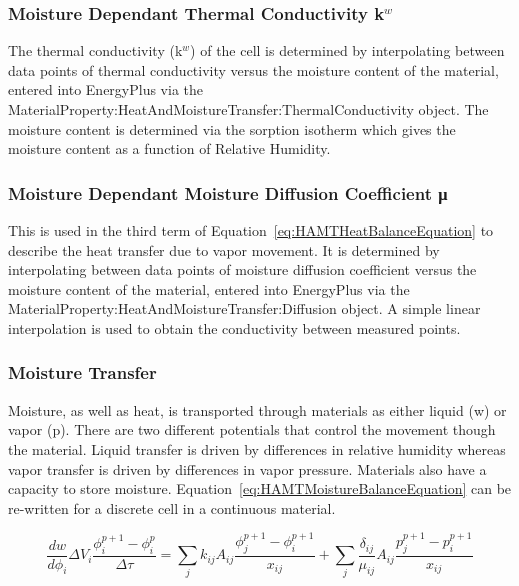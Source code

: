\subsubsection{Moisture Dependant Thermal Conductivity k\(^{w}\)}\label{moisture-dependant-thermal-conductivity-kw}

The thermal conductivity (k\(^{w}\)) of the cell is determined by interpolating between data points of thermal conductivity versus the moisture content of the material, entered into EnergyPlus via the MaterialProperty:HeatAndMoistureTransfer:ThermalConductivity object. The moisture content is determined via the sorption isotherm which gives the moisture content as a function of Relative Humidity.

\subsubsection{Moisture Dependant Moisture Diffusion Coefficient μ}\label{moisture-dependant-moisture-diffusion-coefficient-ux3bc}

This is used in the third term of Equation~\ref{eq:HAMTHeatBalanceEquation} to describe the heat transfer due to vapor movement. It is determined by interpolating between data points of moisture diffusion coefficient versus the moisture content of the material, entered into EnergyPlus via the MaterialProperty:HeatAndMoistureTransfer:Diffusion object. A simple linear interpolation is used to obtain the conductivity between measured points.

\subsubsection{Moisture Transfer}\label{moisture-transfer}

Moisture, as well as heat, is transported through materials as either liquid (w) or vapor (p). There are two different potentials that control the movement though the material. Liquid transfer is driven by differences in relative humidity whereas vapor transfer is driven by differences in vapor pressure. Materials also have a capacity to store moisture. Equation~\ref{eq:HAMTMoistureBalanceEquation} can be re-written for a discrete cell in a continuous material.

\begin{equation}
\frac{{dw}}{{d{\phi_i}}}\Delta {V_i}\frac{{\phi_i^{p + 1} - \phi_i^p}}{{\Delta \tau }} = \sum\limits_j {{k_{ij}}{A_{ij}}\frac{{\phi_j^{p + 1} - \phi_i^{p + 1}}}{{{x_{ij}}}}}  + \sum\limits_j {\frac{{{\delta_{ij}}}}{{{\mu_{ij}}}}{A_{ij}}\frac{{p_j^{p + 1} - p_i^{p + 1}}}{{{x_{ij}}}}}
\label{eq:HAMTMoistureBalanceEquationDiscreteCell}
\end{equation}

